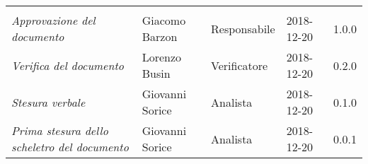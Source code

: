\newpage 
\section*{}
\begin{table}[H]
	\centering
	\begin{tabular}{p{4cm}|C{3cm}|C{3cm}|R{2.5cm}|R{2cm}}
		
		 & & & & \\
		
		
		\emph{Approvazione del documento} &  Giacomo Barzon & Responsabile & 2018-12-20 & 1.0.0 \\
		\hline
		
		\emph{Verifica del documento} & Lorenzo Busin & Verificatore & 2018-12-20 & 0.2.0 \\
		\hline

		\emph{Stesura verbale} & Giovanni Sorice & Analista & 2018-12-20 & 0.1.0 \\
		\hline
		
		\emph{Prima stesura dello scheletro del documento} & Giovanni Sorice & Analista & 2018-12-20 & 0.0.1 \\
		
	\end{tabular}
	
\end{table}


\clearpage